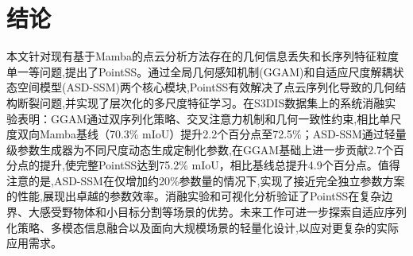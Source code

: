 \documentclass[preprint,12pt]{elsarticle}
\begin{document}
\section{结论}
本文针对现有基于Mamba的点云分析方法存在的几何信息丢失和长序列特征粒度单一等问题,提出了PointSS。通过全局几何感知机制(GGAM)和自适应尺度解耦状态空间模型(ASD-SSM)两个核心模块,PointSS有效解决了点云序列化导致的几何结构断裂问题,并实现了层次化的多尺度特征学习。在S3DIS数据集上的系统消融实验表明：GGAM通过双序列化策略、交叉注意力机制和几何一致性约束,相比单尺度双向Mamba基线（70.3\% mIoU）提升2.2个百分点至72.5\%；ASD-SSM通过轻量级参数生成器为不同尺度动态生成定制化参数,在GGAM基础上进一步贡献2.7个百分点的提升,使完整PointSS达到75.2\% mIoU，相比基线总提升4.9个百分点。值得注意的是,ASD-SSM在仅增加约20\%参数量的情况下,实现了接近完全独立参数方案的性能,展现出卓越的参数效率。消融实验和可视化分析验证了PointSS在复杂边界、大感受野物体和小目标分割等场景的优势。未来工作可进一步探索自适应序列化策略、多模态信息融合以及面向大规模场景的轻量化设计,以应对更复杂的实际应用需求。









\end{document}
